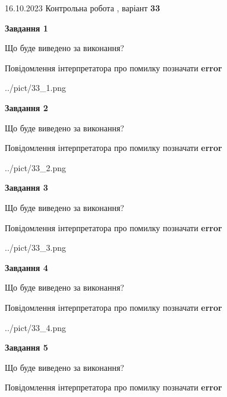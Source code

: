 \documentclass[12pt, ukrainian]{article}
\begin{document}
{\Large{16.10.2023 Контрольна робота , варіант  \No \textbf { 33 }\par}}
{
\begin {large}
{\begin {center}\textbf{Завдання 1}\end {center}}\par
Що буде виведено за виконання? \par
Повідомлення інтерпретатора про помилку позначати \textbf{error}

\begin{center}
	{../pict/33_1.png}
\end{center}
\newpage

{\begin {center}\textbf{Завдання 2}\end {center}}\par
Що буде виведено за виконання? \par
Повідомлення інтерпретатора про помилку позначати \textbf{error}

\begin{center}
	{../pict/33_2.png}
\end{center}
\newpage

{\begin {center}\textbf{Завдання 3}\end {center}}\par
Що буде виведено за виконання? \par
Повідомлення інтерпретатора про помилку позначати \textbf{error}

\begin{center}
	{../pict/33_3.png}
\end{center}
\newpage

{\begin {center}\textbf{Завдання 4}\end {center}}\par
Що буде виведено за виконання? \par
Повідомлення інтерпретатора про помилку позначати \textbf{error}

\begin{center}
	{../pict/33_4.png}
\end{center}
\newpage

{\begin {center}\textbf{Завдання 5}\end {center}}\par
Що буде виведено за виконання? \par
Повідомлення інтерпретатора про помилку позначати \textbf{error}


\end{large}}
\end{document}

